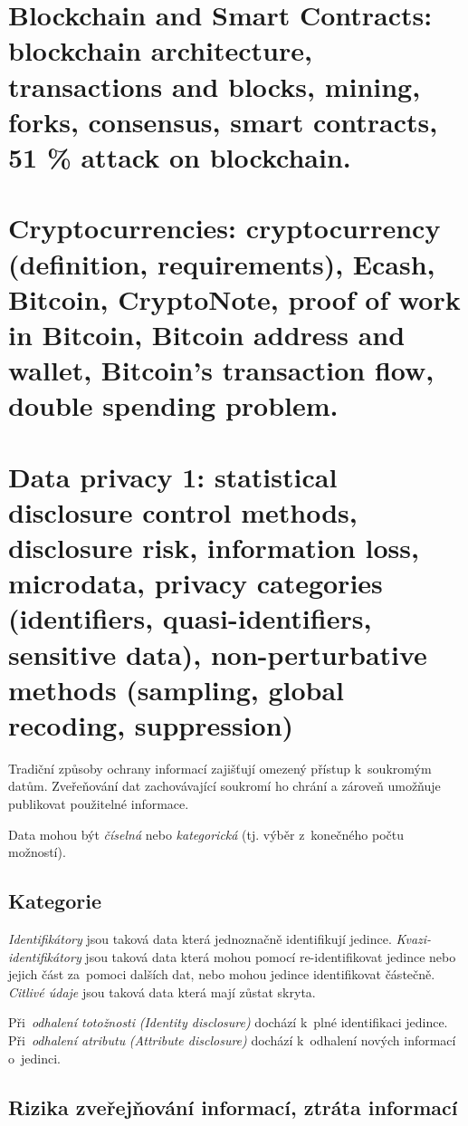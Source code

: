 \clearpage
\section{Blockchain and Smart Contracts: blockchain architecture, transactions and blocks, mining, forks, consensus, smart contracts, 51 \% attack on blockchain.}

\clearpage
\section{Cryptocurrencies: cryptocurrency (definition, requirements), Ecash, Bitcoin, CryptoNote, proof of work in Bitcoin, Bitcoin address and wallet, Bitcoin’s transaction flow, double spending problem.}



\clearpage
\section{Data privacy 1: statistical disclosure control methods, disclosure risk, information loss, microdata, privacy categories (identifiers, quasi-identifiers, sensitive data), non-perturbative methods (sampling, global recoding, suppression)}

Tradiční způsoby ochrany informací zajišťují omezený přístup k~soukromým datům.
Zveřeňování dat zachovávající soukromí ho chrání a zároveň umožňuje publikovat použitelné informace.

Data mohou být \emph{číselná} nebo \emph{kategorická} (tj. výběr z~konečného počtu možností).


\subsection{Kategorie}

\emph{Identifikátory} jsou taková data která jednoznačně identifikují jedince.
\emph{Kvazi-identifikátory} jsou taková data která mohou pomocí re-identifikovat jedince nebo jejich část za~pomoci dalších dat, nebo mohou jedince identifikovat částečně.
\emph{Citlivé údaje} jsou taková data která mají zůstat skryta.

Při~\emph{odhalení totožnosti} \emph{(Identity disclosure)} dochází k~plné identifikaci jedince.
Při~\emph{odhalení atributu} \emph{(Attribute disclosure)} dochází k~odhalení nových informací o~jedinci.


\subsection{Rizika zveřejňování informací, ztráta informací}

